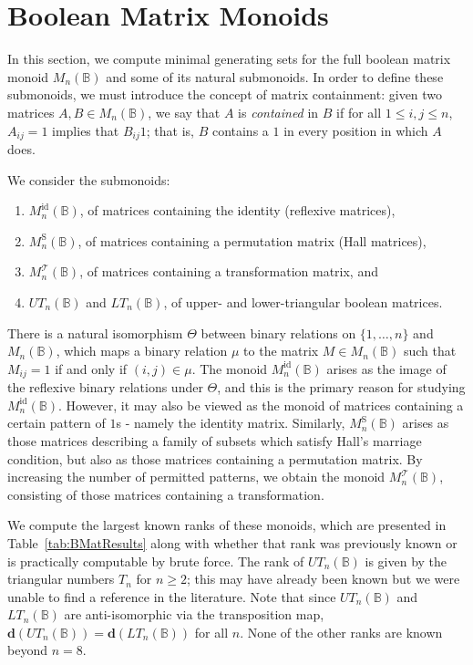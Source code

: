 \documentclass[11pt]{article}
\numberwithin{equation}{section}
\newcommand{\B}{\mathbb{B}}
\newcommand{\Bn}{M_n(\B)}
\newcommand{\Refn}{M_n^{\text{id}}(\B)}
\newcommand{\Halln}{M_n^{\text{S}}(\B)}
\newcommand{\MTn}{M_n^{\mathcal{T}}(\B)}
\newcommand{\UTn}{UT_n(\B)}
\newcommand{\LTn}{LT_n(\B)}
\begin{document}


\section{Boolean Matrix Monoids}
\label{sec:boolmat}

In this section, we compute minimal generating sets for the full boolean matrix
monoid $\Bn$ and some of its natural submonoids. In order to define these
submonoids, we must introduce the concept of matrix containment: given two
matrices $A, B \in \Bn$, we say that $A$ is \emph{contained} in $B$ if for all
$1 \leq i,j \leq n$, $A_{ij} = 1$ implies that $B_{ij} 1$; that is, $B$ contains
a $1$ in every position in which $A$ does.

We consider the submonoids:
\begin{enumerate}[label={\rm (\roman*)}]
  \item $\Refn$, of matrices containing the identity (reflexive matrices),
  \item $\Halln$, of matrices containing a permutation matrix (Hall matrices),
  \item $\MTn$, of matrices containing a transformation matrix, and
  \item $\UTn$ and $\LTn$, of upper- and lower-triangular boolean matrices.
\end{enumerate}

There is a natural isomorphism $\Theta$ between binary relations on $\{1,
  \ldots, n\}$ and $\Bn$, which maps a binary relation $\mu$ to the matrix $M
\in \Bn$ such that $M_{ij} = 1$ if and only if $(i, j) \in \mu$.
The monoid $\Refn$ arises as the image of the reflexive binary relations under
$\Theta$, and this is the primary reason for studying $\Refn$. However, it may
also be viewed as the monoid of matrices containing a certain pattern of $1$s -
namely the identity matrix. Similarly, $\Halln$ arises as those matrices
describing a family of subsets which satisfy Hall's marriage condition, but also
as those matrices containing a permutation matrix. By increasing the number of
permitted patterns, we obtain the monoid $\MTn$, consisting of those matrices
containing a transformation. 

We compute the largest known ranks of these monoids, which are presented in
Table~\ref{tab:BMatResults} along with whether that rank was previously known or
is practically computable by brute force. The rank of $\UTn$ is given by the
triangular numbers $T_n$ for $n \geq 2$; this may have already been known but we
were unable to find a reference in the literature. Note that since $\UTn$ and
$\LTn$ are anti-isomorphic via the transposition map, $\mathbf{d}(\UTn) =
\mathbf{d}(\LTn)$ for all $n$. None of the other ranks are known beyond $n = 8$. 
\end{document}
